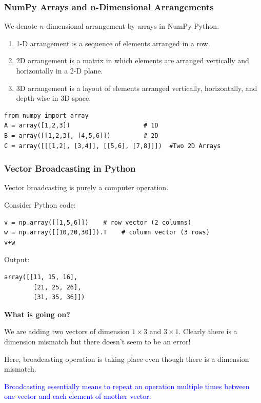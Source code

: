 \documentclass[aspectratio=169,xcolor=dvipsnames,svgnames,x11names,fleqn]{beamer}
\begin{document}
\begin{frame}[containsverbatim]
\frametitle{NumPy Arrays and n-Dimensional Arrangements}

We denote $n$-dimensional arrangement by arrays in NumPy Python.

\begin{enumerate}
    \item 1-D arrangement is a sequence of elements arranged in a row.
    
    \item 2D arrangement is a matrix in which elements are arranged vertically and horizontally in a 2-D plane.
    
    \item 3D arrangement is a layout of elements arranged vertically, horizontally, and depth-wise in 3D space.
\end{enumerate}

\vspace{0.5cm}


\begin{verbatim}
from numpy import array
A = array([1,2,3])                    # 1D
B = array([[1,2,3], [4,5,6]])         # 2D
C = array([[[1,2], [3,4]], [[5,6], [7,8]]])  #Two 2D Arrays
\end{verbatim}



\end{frame}

\begin{frame}[containsverbatim]
\frametitle{Vector Broadcasting in Python}

\small

Vector broadcasting is purely a computer operation.

Consider Python code:

\begin{verbatim}
v = np.array([[1,5,6]])    # row vector (2 columns)
w = np.array([[10,20,30]]).T    # column vector (3 rows)
v+w
\end{verbatim}

Output:

\begin{verbatim}
array([[11, 15, 16],
        [21, 25, 26],
        [31, 35, 36]])
\end{verbatim}

\textbf{What is going on?}

We are adding two vectors of dimension $1 \times 3$ and $3 \times 1$. Clearly there is a dimension mismatch but there doesn't seem to be an error!

Here, broadcasting operation is taking place even though there is a dimension mismatch.

\textcolor{blue}{Broadcasting essentially means to repeat an operation multiple times between one vector and each element of another vector.}

\end{frame}
\end{document}

